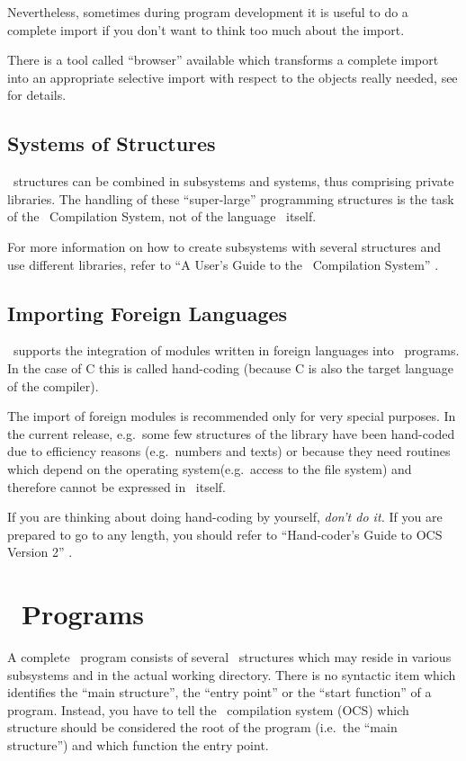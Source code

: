 Nevertheless, sometimes during program development it is useful to
do a complete import if you don't want to think too much about
the import.

There is a tool called ``browser'' available which transforms a complete
import into an appropriate selective import with respect to the
objects really needed, see \cite{browser} for details.


\subsection{Systems of Structures}
\advanced
\opal\ structures can be combined in subsystems and systems, thus 
comprising  private libraries. 
The handling of these ``super-large'' programming structures is the task
of the \opal\ Compilation System, not of the language \opal\ itself.

For more information on how to create subsystems with
several structures and use different libraries, refer to ``A User's
Guide to the \opal\ Compilation System'' \cite{Ma}.


\subsection{Importing Foreign Languages}
\experienced \opal\ supports the integration of modules written in
foreign languages into \opal\ programs.
In the case of C this is called hand-coding (because C is also the
target language of the compiler).

The import of foreign modules is recommended only for very special
purposes.
In the current release, e.g.~some few structures of the library have
been hand-coded due to efficiency reasons (e.g.~numbers and texts) or
because they need  routines which depend on the operating
system(e.g.~access to  the file system) and therefore cannot be
expressed in \opal\ itself. 

If you are thinking about doing hand-coding by yourself, {\em don't do it.\/} 
If you are prepared to go to any length, you should refer to
``Hand-coder's Guide to OCS Version 2'' \cite{handcoding}.

\section{\opal\ Programs}
\label{sec:opalProg}
\novice
A complete \opal\ program consists of several \opal\ structures which
may reside in various subsystems and in the actual working
directory. 
There is no syntactic item which identifies the ``main structure'', the
``entry point'' or the ``start function'' of a program.
Instead, you have to tell the \opal\ compilation system (OCS)
which structure should be considered the root of the program (i.e.~the
``main structure'') and which function the entry point.

